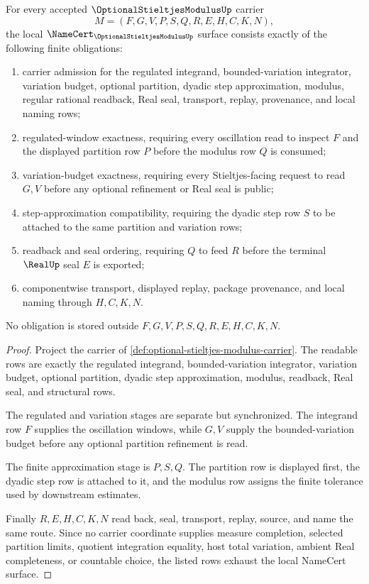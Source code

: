 \begin{theorem}
\label{thm:optional-stieltjes-modulus-namecert-obligations}
For every accepted $\OptionalStieltjesModulusUp$ carrier
$$
M=(F,G,V,P,S,Q,R,E,H,C,K,N),
$$
the local $\NameCert_{\OptionalStieltjesModulusUp}$ surface consists exactly of the following finite obligations:
\begin{enumerate}
\item carrier admission for the regulated integrand, bounded-variation integrator, variation budget, optional partition, dyadic step approximation, modulus, regular rational readback, Real seal, transport, replay, provenance, and local naming rows;
\item regulated-window exactness, requiring every oscillation read to inspect $F$ and the displayed partition row $P$ before the modulus row $Q$ is consumed;
\item variation-budget exactness, requiring every Stieltjes-facing request to read $G,V$ before any optional refinement or Real seal is public;
\item step-approximation compatibility, requiring the dyadic step row $S$ to be attached to the same partition and variation rows;
\item readback and seal ordering, requiring $Q$ to feed $R$ before the terminal $\RealUp$ seal $E$ is exported;
\item componentwise transport, displayed replay, package provenance, and local naming through $H,C,K,N$.
\end{enumerate}
No obligation is stored outside $F,G,V,P,S,Q,R,E,H,C,K,N$.
\end{theorem}
\begin{proof}
Project the carrier of \autoref{def:optional-stieltjes-modulus-carrier}. The readable rows are exactly the regulated integrand, bounded-variation integrator, variation budget, optional partition, dyadic step approximation, modulus, readback, Real seal, and structural rows.

The regulated and variation stages are separate but synchronized. The integrand row $F$ supplies the oscillation windows, while $G,V$ supply the bounded-variation budget before any optional partition refinement is read.

The finite approximation stage is $P,S,Q$. The partition row is displayed first, the dyadic step row is attached to it, and the modulus row assigns the finite tolerance used by downstream estimates.

Finally $R,E,H,C,K,N$ read back, seal, transport, replay, source, and name the same route. Since no carrier coordinate supplies measure completion, selected partition limits, quotient integration equality, host total variation, ambient Real completeness, or countable choice, the listed rows exhaust the local NameCert surface.
\end{proof}

